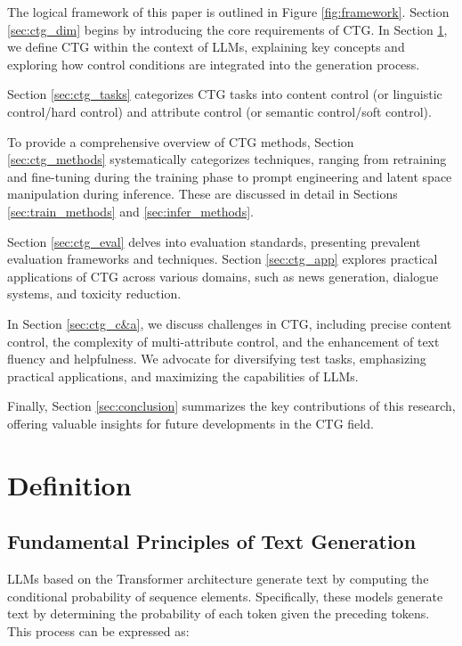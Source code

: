 \documentclass[acmsmall, screen]{acmart}
\begin{document}
The logical framework of this paper is outlined in Figure \ref{fig:framework}. Section \ref{sec:ctg_dim} begins by introducing the core requirements of CTG. In Section \ref{sec:ctg_def}, we define CTG within the context of LLMs, explaining key concepts and exploring how control conditions are integrated into the generation process.

Section \ref{sec:ctg_tasks} categorizes CTG tasks into content control (or linguistic control/hard control) and attribute control (or semantic control/soft control).

To provide a comprehensive overview of CTG methods, Section \ref{sec:ctg_methods} systematically categorizes techniques, ranging from retraining and fine-tuning during the training phase to prompt engineering and latent space manipulation during inference. These are discussed in detail in Sections \ref{sec:train_methods} and \ref{sec:infer_methods}.

Section \ref{sec:ctg_eval} delves into evaluation standards, presenting prevalent evaluation frameworks and techniques. Section \ref{sec:ctg_app} explores practical applications of CTG across various domains, such as news generation, dialogue systems, and toxicity reduction.

In Section \ref{sec:ctg_c&a}, we discuss challenges in CTG, including precise content control, the complexity of multi-attribute control, and the enhancement of text fluency and helpfulness. We advocate for diversifying test tasks, emphasizing practical applications, and maximizing the capabilities of LLMs.

Finally, Section \ref{sec:conclusion} summarizes the key contributions of this research, offering valuable insights for future developments in the CTG field.

\section{Definition}
\label{sec:ctg_def}

\subsection{Fundamental Principles of Text Generation}
LLMs based on the Transformer architecture \cite{vaswani_nips17_transformer} generate text by computing the conditional probability of sequence elements. Specifically, these models generate text by determining the probability of each token given the preceding tokens. This process can be expressed as:
\end{document}
